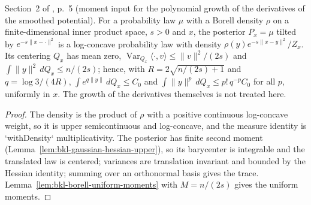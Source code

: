 \begin{lemma}
  \label{lem:bkl-gaussian-posterior-moments}
  \leanok
  Section~2 of \cite{BizeulKlartagLehec2026}, p.~5 (moment input for the polynomial growth of the
  derivatives of the smoothed potential). For a probability law $\mu$ with a Borell density
  $\rho$ on a finite-dimensional inner product space, $s>0$ and $x$, the posterior
  $P_x=\mu$ tilted by $e^{-s\|x-\cdot\|^2}$ is a log-concave probability law with density
  $\rho(y)e^{-s\|x-y\|^2}/Z_x$. Its centering $Q_x$ has mean zero,
  $\operatorname{Var}_{Q_x}\langle\cdot,v\rangle\le\|v\|^2/(2s)$ and $\int\|y\|^2\,dQ_x\le n/(2s)$;
  hence, with $R=2\sqrt{n/(2s)+1}$ and $q=\log3/(4R)$, $\int e^{q\|y\|}\,dQ_x\le C_0$ and
  $\int\|y\|^p\,dQ_x\le p!\,q^{-p}C_0$ for all $p$, uniformly in $x$. The growth of the
  derivatives themselves is not treated here.
\end{lemma}
\begin{proof}
  \leanok
  The density is the product of $\rho$ with a positive continuous log-concave weight, so it is
  upper semicontinuous and log-concave, and the measure identity is `withDensity` multiplicativity.
  The posterior has finite second moment (Lemma~\ref{lem:bkl-gaussian-hessian-upper}), so its
  barycenter is integrable and the translated law is centered; variances are translation
  invariant and bounded by the Hessian identity; summing over an orthonormal basis gives the
  trace. Lemma~\ref{lem:bkl-borell-uniform-moments} with $M=n/(2s)$ gives the uniform moments.
\end{proof}

